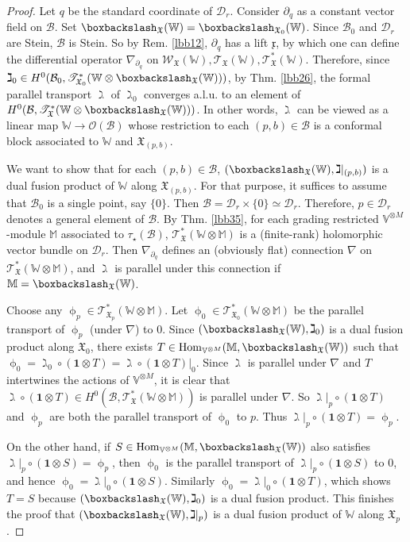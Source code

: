 \documentclass[11pt,b5paper,notitlepage]{article}
\theoremstyle{definition}
\theoremstyle{plain}
\newcommand{\mc}{\mathcal}
\newcommand{\idt}{\mathbf{1}}
\newcommand{\Hom}{\mathrm{Hom}}
\newcommand{\scr}{\mathscr}
\newcommand{\xk}{\mathfrak x}
\newcommand{\Vbb}{\mathbb V}
\newcommand{\Wbb}{\mathbb W}
\newcommand{\Mbb}{\mathbb M}
\newcommand{\<}{\left\langle}
\renewcommand{\>}{\right\rangle}
\newcommand{\MB}{\mathcal{B}}
\newcommand{\fx}{\mathfrak{X}}
\newcommand{\MD}{\mathcal{D}}
\newcommand{\bbs}{\boxbackslash}
\numberwithin{equation}{subsection}
\begin{document}
\begin{proof}
Let $q$ be the standard coordinate of $\MD_r$. Consider $\partial_q$ as a constant vector field on $\MB$. Set $\bbs_\fx(\Wbb)=\bbs_{\fx_0}(\Wbb)$. Since $\MB_0$ and $\MD_r$ are Stein, $\MB$ is Stein. So by Rem. \ref{lbb12}, $\partial_q$ has a lift $\xk$, by which one can define the differential operator $\nabla_{\partial_q}$ on $\scr W_\fx(\Wbb),\scr T_\fx(\Wbb),\scr T_\fx^*(\Wbb)$. Therefore, since $\gimel_0\in H^0(\MB_0,\scr T_{\fx_0}^*(\Wbb\otimes\bbs_\fx(\Wbb)))$, by Thm. \ref{lbb26}, the formal parallel transport $\gimel$ of $\gimel_0$ converges a.l.u. to an element of $H^0(\MB,\scr T_\fx^*(\Wbb\otimes\bbs_\fx(\Wbb)))$. In other words, $\gimel$ can be viewed as a linear map $\Wbb\rightarrow\mc O(\MB)$ whose restriction to each $(p,b)\in\MB$ is a conformal block associated to $\Wbb$ and $\fx_{(p,b)}$.

We want to show that for each $(p,b)\in\MB$, $(\bbs_\fx(\Wbb),\gimel|_{(p,b)})$ is a dual fusion product of $\Wbb$ along $\fx_{(p,b)}$. For that purpose, it suffices to assume that $\MB_0$ is a single point, say $\{0\}$. Then $\MB=\MD_r\times\{0\}\simeq\MD_r$. Therefore, $p\in\MD_r$ denotes a general element of $\MB$. By Thm. \ref{lbb35}, for each grading restricted $\Vbb^{\otimes M}$-module $\Mbb$ associated to $\tau_\star(\MB)$, $\scr T_\fx^*(\Wbb\otimes\Mbb)$ is a (finite-rank) holomorphic vector bundle on $\MD_r$. Then $\nabla_{\partial_q}$ defines an (obviously flat) connection $\nabla$ on $\scr T_\fx^*(\Wbb\otimes\Mbb)$, and $\gimel$ is parallel under this connection if $\Mbb=\bbs_\fx(\Wbb)$. 

Choose any $\upphi_p\in\scr T_{\fx_p}^*(\Wbb\otimes\Mbb)$. Let $\upphi_0\in\scr T_{\fx_0}^*(\Wbb\otimes \Mbb)$ be the parallel transport of $\upphi_p$ (under $\nabla$) to $0$. Since $(\bbs_\fx(\Wbb),\gimel_0)$ is a dual fusion product along $\fx_0$, there exists $T\in\Hom_{\Vbb^{\otimes M}}(\Mbb,\bbs_\fx(\Wbb))$ such that $\upphi_0=\gimel_0\circ(\idt\otimes T)=\gimel\circ(\idt\otimes T)|_0$. Since $\gimel$ is parallel under $\nabla$ and $T$ intertwines the actions of $\Vbb^{\otimes M}$, it is clear that $\gimel\circ(\idt\otimes T)\in H^0(\MB,\scr T_\fx^*(\Wbb\otimes \Mbb))$ is parallel under $\nabla$. So $\gimel|_p\circ(\idt\otimes T)$ and $\upphi_p$ are both the parallel transport of $\upphi_0$ to $p$. Thus $\gimel|_p\circ(\idt\otimes T)=\upphi_p$.

On the other hand, if $S\in\Hom_{\Vbb^{\otimes M}}(\Mbb,\bbs_\fx(\Wbb))$ also satisfies $\gimel|_p\circ(\idt\otimes S)=\upphi_p$, then $\upphi_0$ is the parallel transport of $\gimel|_p\circ(\idt\otimes S)$ to $0$, and hence $\upphi_0=\gimel|_0\circ(\idt\otimes S)$. Similarly $\upphi_0=\gimel|_0\circ(\idt\otimes T)$, which shows $T=S$ because $(\bbs_\fx(\Wbb),\gimel_0)$ is a dual fusion product. This finishes the proof that $(\bbs_\fx(\Wbb),\gimel|_p)$ is a dual fusion product of $\Wbb$ along $\fx_p$.
\end{proof}
\end{document}
